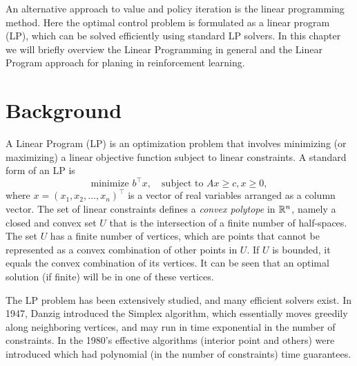 




An alternative approach to value and policy iteration is the linear programming method. Here the optimal control problem is formulated as a linear program (LP), which can be solved efficiently using standard LP solvers.  
%
In this chapter we will briefly overview the Linear Programming in general and the Linear Program approach for planing in reinforcement learning.


\section{Background}

A Linear Program (LP) is an optimization problem that involves
minimizing (or maximizing) a linear objective function subject to
linear constraints. A standard form of an LP is
\begin{equation}\label{eq:LP}
 \textrm{minimize } {b^\top}x,   \quad \textrm{subject to } Ax \ge c,  x \ge 0,
\end{equation}
where $x = {({x_1},{x_2}, \ldots ,{x_n})^\top}$ is a vector of real
variables arranged as a column vector. The set of linear constraints defines a \emph{convex polytope} in $\mathbb{R}^n$, namely a
closed and convex set $U$ that is the intersection of a finite
number of half-spaces. The set $U$ has a finite number of vertices, which are points that cannot be represented as a convex combination of other points in $U$. If $U$ is bounded, it equals the convex combination of its vertices. It can be seen that an optimal solution (if finite) will be in one of these vertices.

The LP problem has been extensively studied, and many efficient solvers exist. In 1947, Danzig introduced the Simplex algorithm, which essentially moves greedily along neighboring vertices, and may run in time exponential in the number of constraints. In the 1980's effective algorithms (interior point and others) were introduced which had polynomial (in the number of
constraints) time guarantees.

